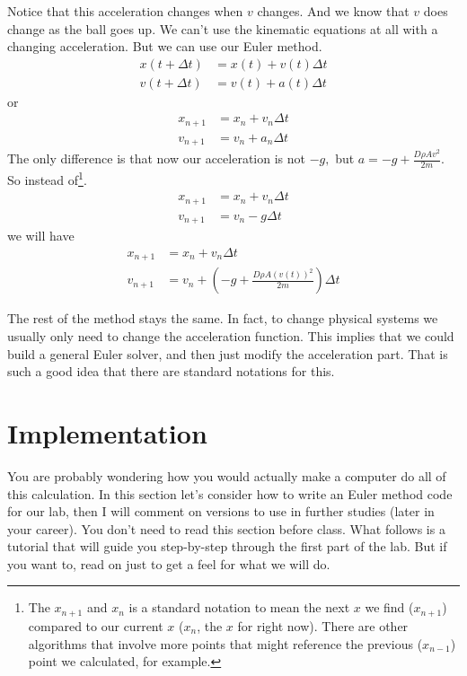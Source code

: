 \documentclass[twoside,11pt,ShortChapTitles]{BYUTextbook}
\begin{document}
Notice that this acceleration changes when $v$ changes. And we know that $v$
does change as the ball goes up. We can't use the kinematic equations at all
with a changing acceleration. But we can use our Euler method. \begin{align*}
x(t+\Delta t)  & =x(t)+v(t)\Delta t\\
v(t+\Delta t)  & =v(t)+a\left(  t\right)  \Delta t
\end{align*}
or \begin{align*}
x_{n+1}  & =x_{n}+v_{n}\Delta t\\
v_{n+1}  & =v_{n}+a_{n}\Delta t
\end{align*}
The only difference is that now our acceleration is not $-g,$ but
$a=-g+\frac{D\rho Av^{2}}{2m}.$ So instead of\footnote{The $x_{n+1}$ and $x_{n}$ is a standard notation to mean the next $x$ we find ($x_{n+1}$) compared to our current $x$ ($x_n$, the $x$ for right now). There are other algorithms that involve more points that might reference the previous ($x_{n-1}$) point we calculated, for example.}.
\begin{align*}
x_{n+1}  & =x_{n}+v_{n}\Delta t\\
v_{n+1}  & =v_{n}-g\Delta t
\end{align*}
we will have \begin{align*}
x_{n+1}  & =x_{n}+v_{n}\Delta t\\
v_{n+1}  & =v_{n}+\left(  -g+\frac{D\rho A\left(  v(t)\right)  ^{2}} {2m}\right)  \Delta t
\end{align*}


The rest of the method stays the same. In fact, to change physical systems we
usually only need to change the acceleration function. This implies that we
could build a general Euler solver, and then just modify the acceleration
part. That is such a good idea that there are standard notations for this.


\section{Implementation}

You are probably wondering how you would actually make a computer do all of
this calculation. In this section let's consider how to write an Euler method
code for our lab, then I will comment on versions to use in further studies
(later in your career). You don't need to read this section before class. What
follows is a tutorial that will guide you step-by-step through the first part
of the lab. But if you want to, read on just to get a feel for what we will do.
\end{document}
